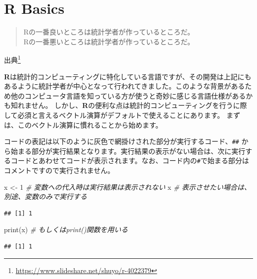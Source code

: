 \documentclass[
  12pt,
]{book}
\newenvironment{Shaded}{\begin{snugshade}}{\end{snugshade}}
\newcommand{\CommentTok}[1]{\textcolor[rgb]{0.56,0.35,0.01}{\textit{#1}}}
\newcommand{\DecValTok}[1]{\textcolor[rgb]{0.00,0.00,0.81}{#1}}
\newcommand{\FunctionTok}[1]{\textcolor[rgb]{0.00,0.00,0.00}{#1}}
\newcommand{\NormalTok}[1]{#1}
\newcommand{\OtherTok}[1]{\textcolor[rgb]{0.56,0.35,0.01}{#1}}
\DeclareRobustCommand{\href}[2]{#2\footnote{\url{#1}}}
\begin{document}
\hypertarget{Appendix-RBasics}{%
\chapter{R Basics}\label{Appendix-RBasics}}

\begin{quote}
Rの一番良いところは統計学者が作っているところだ。\\
Rの一番悪いところは統計学者が作っているところだ。
\end{quote}

\href{https://www.slideshare.net/shuyo/r-4022379}{出典}

\textbf{R}は統計的コンピューティングに特化している言語ですが、その開発は上記にもあるように統計学者が中心となって行われてきました。このような背景があるため他のコンピュータ言語を知っている方が使うと奇妙に感じる言語仕様があるかも知れません。 しかし、\textbf{R}の便利な点は統計的コンピューティングを行うに際して必須と言えるベクトル演算がデフォルトで使えることにあります。 まずは、このベクトル演算に慣れることから始めます。

コードの表記は以下のように灰色で網掛けされた部分が実行するコード、\texttt{\#\#} から始まる部分が実行結果となります。実行結果の表示がない場合は、次に実行するコードとあわせてコードが表示されます。なお、コード内の\texttt{\#}で始まる部分はコメントですので実行されません。

\begin{Shaded}
\begin{Highlighting}[numbers=left,,]
\NormalTok{x }\OtherTok{\textless{}{-}} \DecValTok{1}        \CommentTok{\# 変数への代入時は実行結果は表示されない}
\NormalTok{x             }\CommentTok{\# 表示させたい場合は、別途、変数のみで実行する}
\end{Highlighting}
\end{Shaded}

\begin{verbatim}
## [1] 1
\end{verbatim}

\begin{Shaded}
\begin{Highlighting}[numbers=left,,]
\FunctionTok{print}\NormalTok{(x)      }\CommentTok{\# もしくはprint()関数を用いる}
\end{Highlighting}
\end{Shaded}

\begin{verbatim}
## [1] 1
\end{verbatim}
\end{document}
